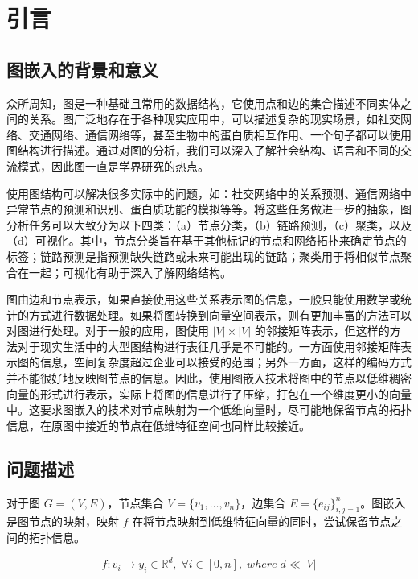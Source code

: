 \documentclass{ctexart}
\begin{document}


\tableofcontents
\newpage

\section{引言}

\subsection{图嵌入的背景和意义}

众所周知，图是一种基础且常用的数据结构，它使用点和边的集合描述不同实体之间的关系。图广泛地存在于各种现实应用中，可以描述复杂的现实场景，如社交网络、交通网络、通信网络等，甚至生物中的蛋白质相互作用、一个句子都可以使用图结构进行描述。通过对图的分析，我们可以深入了解社会结构、语言和不同的交流模式，因此图一直是学界研究的热点。

使用图结构可以解决很多实际中的问题，如：社交网络中的关系预测、通信网络中异常节点的预测和识别、蛋白质功能的模拟等等。将这些任务做进一步的抽象，图分析任务可以大致分为以下四类：（a）节点分类，（b）链路预测，（c）聚类，以及（d）可视化\cite{goyal2018graph}。其中，节点分类旨在基于其他标记的节点和网络拓扑来确定节点的标签；链路预测是指预测缺失链路或未来可能出现的链路；聚类用于将相似节点聚合在一起；可视化有助于深入了解网络结构。

图由边和节点表示，如果直接使用这些关系表示图的信息，一般只能使用数学或统计的方式进行数据处理。如果将图转换到向量空间表示，则有更加丰富的方法可以对图进行处理。对于一般的应用，图使用 \(|V| \times |V|\) 的邻接矩阵表示，但这样的方法对于现实生活中的大型图结构进行表征几乎是不可能的。一方面使用邻接矩阵表示图的信息，空间复杂度超过企业可以接受的范围；另外一方面，这样的编码方式并不能很好地反映图节点的信息。因此，使用图嵌入技术将图中的节点以低维稠密向量的形式进行表示，实际上将图的信息进行了压缩，打包在一个维度更小的向量中。这要求图嵌入的技术对节点映射为一个低维向量时，尽可能地保留节点的拓扑信息，在原图中接近的节点在低维特征空间也同样比较接近。

\subsection{问题描述}

对于图 $G=(V,E)$，节点集合 $V=\{v_1,\dots,v_n\}$，边集合 $E=\{ e_{ij} \}_{i,j=1}^n$。图嵌入是图节点的映射，映射 $f$ 在将节点映射到低维特征向量的同时，尝试保留节点之间的拓扑信息。

$$
f:v_i \to y_i \in \mathbb{R}^d, \;\forall i \in[0,n],\;where\; d \ll |V|
$$
\end{document}
